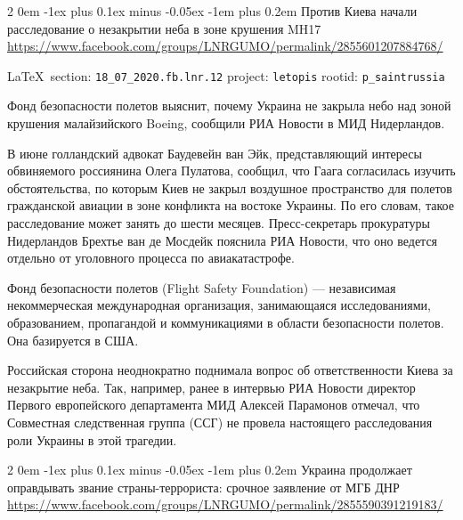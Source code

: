 \documentclass[a4paper,11pt]{extreport}
\makeatletter
\renewcommand\subsection{%
  \clearpage
    \@startsection{subsection}%
    {2}%
    {0em}%
    {-1ex plus 0.1ex minus -0.05ex}%
    {-1em plus 0.2em}%
    {\scshape\bfseries\Large}%
}
\makeatother
\begin{document}

\subsection{Против Киева начали расследование о незакрытии неба в зоне крушения MH17}
\label{sec:18_07_2020.fb.lnr.12}
\url{https://www.facebook.com/groups/LNRGUMO/permalink/2855601207884768/}
  
\vspace{0.5cm}
{\small\LaTeX~section: \verb|18_07_2020.fb.lnr.12| project: \verb|letopis| rootid: \verb|p_saintrussia|}
\vspace{0.5cm}


Фонд безопасности полетов выяснит, почему Украина не закрыла небо над зоной
крушения малайзийского Boeing, сообщили РИА Новости в МИД Нидерландов.

В июне голландский адвокат Баудевейн ван Эйк, представляющий интересы
обвиняемого россиянина Олега Пулатова, сообщил, что Гаага согласилась изучить
обстоятельства, по которым Киев не закрыл воздушное пространство для полетов
гражданской авиации в зоне конфликта на востоке Украины. По его словам, такое
расследование может занять до шести месяцев. Пресс-секретарь прокуратуры
Нидерландов Брехтье ван де Мосдейк пояснила РИА Новости, что оно ведется
отдельно от уголовного процесса по авиакатастрофе.

Фонд безопасности полетов (Flight Safety Foundation) --- независимая
некоммерческая международная организация, занимающаяся исследованиями,
образованием, пропагандой и коммуникациями в области безопасности полетов. Она
базируется в США.

Российская сторона неоднократно поднимала вопрос об ответственности Киева за
незакрытие неба. Так, например, ранее в интервью РИА Новости директор Первого
европейского департамента МИД Алексей Парамонов отмечал, что Совместная
следственная группа (ССГ) не провела настоящего расследования роли Украины в
этой трагедии.
  
 
 

\subsection{Украина продолжает оправдывать звание страны-террориста: срочное заявление от МГБ ДНР}
\label{sec:18_07_2020.fb.lnr.13}
\url{https://www.facebook.com/groups/LNRGUMO/permalink/2855590391219183/}
  
\end{document}

